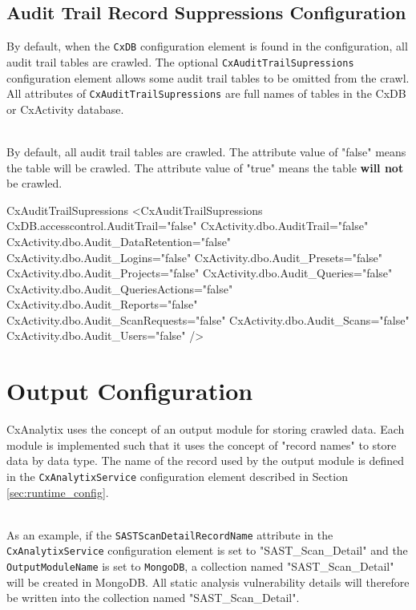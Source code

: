 \subsection{Audit Trail Record Suppressions Configuration}

By default, when the \texttt{CxDB} configuration element is found in the configuration, all audit trail tables are crawled.  The
optional \texttt{CxAuditTrailSupressions} configuration element allows some audit trail tables to be omitted from the crawl. 
All attributes of \texttt{CxAuditTrailSupressions} are full names of tables in the CxDB or CxActivity database.

\noindent\\By default, all audit trail tables are crawled.  The attribute value of "false" means the table will be crawled. The attribute
value of "true" means the table \textbf{will not} be crawled.\\

    
\begin{xml}{CxAuditTrailSupressions}{}{}
<CxAuditTrailSupressions
    CxDB.accesscontrol.AuditTrail="false"
    CxActivity.dbo.AuditTrail="false"
    CxActivity.dbo.Audit_DataRetention="false"
    CxActivity.dbo.Audit_Logins="false"
    CxActivity.dbo.Audit_Presets="false"
    CxActivity.dbo.Audit_Projects="false"
    CxActivity.dbo.Audit_Queries="false"
    CxActivity.dbo.Audit_QueriesActions="false"
    CxActivity.dbo.Audit_Reports="false"
    CxActivity.dbo.Audit_ScanRequests="false"
    CxActivity.dbo.Audit_Scans="false"
    CxActivity.dbo.Audit_Users="false"
    />
\end{xml}

\section{Output Configuration}

CxAnalytix uses the concept of an output module for storing crawled data.  Each module is implemented such that it uses the concept of "record names" 
to store data by data type.  The name of the record used by the output module is defined in the \texttt{CxAnalytixService} configuration element described
in Section \ref{sec:runtime_config}.

\noindent\\As an example, if the \texttt{SASTScanDetailRecordName} attribute in the \texttt{CxAnalytixService} configuration element is set to
"SAST\_Scan\_Detail" and the \texttt{OutputModuleName} is set to \texttt{MongoDB}, a collection named "SAST\_Scan\_Detail" will be created in MongoDB.
All static analysis vulnerability details will therefore be written into the collection named "SAST\_Scan\_Detail".

